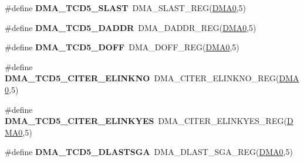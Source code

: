 \begin{DoxyCompactItemize}
\item 
\#define {\bfseries D\+M\+A\+\_\+\+T\+C\+D5\+\_\+\+S\+L\+A\+ST}~D\+M\+A\+\_\+\+S\+L\+A\+S\+T\+\_\+\+R\+EG(\hyperlink{group__DMA__Peripheral__Access__Layer_ga4103044f9ca209772f513dc694513ffb}{D\+M\+A0},5)\hypertarget{group__DMA__Register__Accessor__Macros_ga6300280a7a20a56a96584820c6942421}{}\label{group__DMA__Register__Accessor__Macros_ga6300280a7a20a56a96584820c6942421}

\item 
\#define {\bfseries D\+M\+A\+\_\+\+T\+C\+D5\+\_\+\+D\+A\+D\+DR}~D\+M\+A\+\_\+\+D\+A\+D\+D\+R\+\_\+\+R\+EG(\hyperlink{group__DMA__Peripheral__Access__Layer_ga4103044f9ca209772f513dc694513ffb}{D\+M\+A0},5)\hypertarget{group__DMA__Register__Accessor__Macros_gaf9396476f6de4566cf2caef66b2e6b56}{}\label{group__DMA__Register__Accessor__Macros_gaf9396476f6de4566cf2caef66b2e6b56}

\item 
\#define {\bfseries D\+M\+A\+\_\+\+T\+C\+D5\+\_\+\+D\+O\+FF}~D\+M\+A\+\_\+\+D\+O\+F\+F\+\_\+\+R\+EG(\hyperlink{group__DMA__Peripheral__Access__Layer_ga4103044f9ca209772f513dc694513ffb}{D\+M\+A0},5)\hypertarget{group__DMA__Register__Accessor__Macros_gaed65b973d5ac8e9dbb0bf825058f6b80}{}\label{group__DMA__Register__Accessor__Macros_gaed65b973d5ac8e9dbb0bf825058f6b80}

\item 
\#define {\bfseries D\+M\+A\+\_\+\+T\+C\+D5\+\_\+\+C\+I\+T\+E\+R\+\_\+\+E\+L\+I\+N\+K\+NO}~D\+M\+A\+\_\+\+C\+I\+T\+E\+R\+\_\+\+E\+L\+I\+N\+K\+N\+O\+\_\+\+R\+EG(\hyperlink{group__DMA__Peripheral__Access__Layer_ga4103044f9ca209772f513dc694513ffb}{D\+M\+A0},5)\hypertarget{group__DMA__Register__Accessor__Macros_ga5ba7709b2c12b5d611c4bd4fe9b6a7f9}{}\label{group__DMA__Register__Accessor__Macros_ga5ba7709b2c12b5d611c4bd4fe9b6a7f9}

\item 
\#define {\bfseries D\+M\+A\+\_\+\+T\+C\+D5\+\_\+\+C\+I\+T\+E\+R\+\_\+\+E\+L\+I\+N\+K\+Y\+ES}~D\+M\+A\+\_\+\+C\+I\+T\+E\+R\+\_\+\+E\+L\+I\+N\+K\+Y\+E\+S\+\_\+\+R\+EG(\hyperlink{group__DMA__Peripheral__Access__Layer_ga4103044f9ca209772f513dc694513ffb}{D\+M\+A0},5)\hypertarget{group__DMA__Register__Accessor__Macros_ga893ee9571766a4deef0040cc52f0f353}{}\label{group__DMA__Register__Accessor__Macros_ga893ee9571766a4deef0040cc52f0f353}

\item 
\#define {\bfseries D\+M\+A\+\_\+\+T\+C\+D5\+\_\+\+D\+L\+A\+S\+T\+S\+GA}~D\+M\+A\+\_\+\+D\+L\+A\+S\+T\+\_\+\+S\+G\+A\+\_\+\+R\+EG(\hyperlink{group__DMA__Peripheral__Access__Layer_ga4103044f9ca209772f513dc694513ffb}{D\+M\+A0},5)\hypertarget{group__DMA__Register__Accessor__Macros_ga48b181f26b13735d9b3d366f746b0995}{}\label{group__DMA__Register__Accessor__Macros_ga48b181f26b13735d9b3d366f746b0995}


\end{DoxyCompactItemize}
